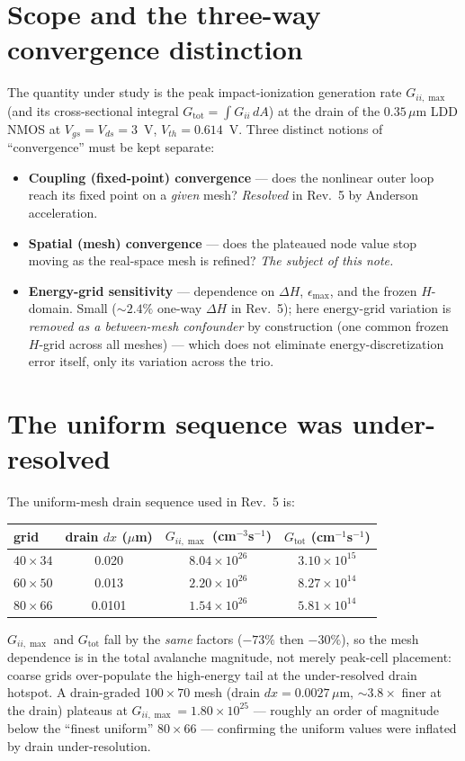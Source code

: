 \documentclass[11pt]{article}
\newcommand{\Gii}{G_{ii,\max}}
\newcommand{\Gtot}{G_{\mathrm{tot}}}
\begin{document}
\section{Scope and the three-way convergence distinction}
The quantity under study is the peak impact-ionization generation rate $\Gii$ (and its
cross-sectional integral $\Gtot=\int G_{ii}\,dA$) at the drain of the $0.35\,\mu$m LDD NMOS at
$V_{gs}=V_{ds}=3$~V, $V_{th}=0.614$~V. Three distinct notions of ``convergence'' must be kept
separate:
\begin{itemize}[nosep]
  \item \textbf{Coupling (fixed-point) convergence} --- does the nonlinear outer loop reach its
  fixed point on a \emph{given} mesh? \emph{Resolved} in Rev.~5 by Anderson acceleration.
  \item \textbf{Spatial (mesh) convergence} --- does the plateaued node value stop moving as the
  real-space mesh is refined? \emph{The subject of this note.}
  \item \textbf{Energy-grid sensitivity} --- dependence on $\Delta H$, $\epsilon_{\max}$, and the
  frozen $H$-domain. Small ($\sim2.4\%$ one-way $\Delta H$ in Rev.~5); here energy-grid variation is
  \emph{removed as a between-mesh confounder} by construction (one common frozen $H$-grid across all
  meshes) --- which does not eliminate energy-discretization error itself, only its variation across
  the trio.
\end{itemize}

\section{The uniform sequence was under-resolved}
The uniform-mesh drain sequence used in Rev.~5 is:
\begin{center}
\begin{tabular}{lccc}
\toprule
grid & drain $dx$ ($\mu$m) & $\Gii$ (cm$^{-3}$s$^{-1}$) & $\Gtot$ (cm$^{-1}$s$^{-1}$)\\
\midrule
$40\times34$ & 0.020  & $8.04\times10^{26}$ & $3.10\times10^{15}$\\
$60\times50$ & 0.013  & $2.20\times10^{26}$ & $8.27\times10^{14}$\\
$80\times66$ & 0.0101 & $1.54\times10^{26}$ & $5.81\times10^{14}$\\
\bottomrule
\end{tabular}
\end{center}
$\Gii$ and $\Gtot$ fall by the \emph{same} factors ($-73\%$ then $-30\%$), so the mesh dependence is
in the total avalanche magnitude, not merely peak-cell placement: coarse grids over-populate the
high-energy tail at the under-resolved drain hotspot. A drain-graded $100\times70$ mesh
(drain $dx=0.0027\,\mu$m, $\sim\!3.8\times$ finer at the drain) plateaus at $\Gii=1.80\times10^{25}$
--- roughly an order of magnitude below the ``finest uniform'' $80\times66$ --- confirming the
uniform values were inflated by drain under-resolution.
\end{document}

